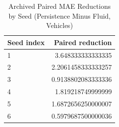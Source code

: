 \begin{table}[t]
\caption{Archived Paired MAE Reductions by Seed (Persistence Minus Fluid, Vehicles)}
\label{tab:paired-seeds}
\centering
\begin{tabular}{lr}
\toprule
Seed index & Paired reduction \\
\midrule
1 & 3.648333333333335 \\
2 & 2.2061458333333257 \\
3 & 0.9138802083333336 \\
4 & 1.819218749999999 \\
5 & 1.6872656250000007 \\
6 & 0.5979687500000036 \\
\bottomrule
\end{tabular}
\end{table}
